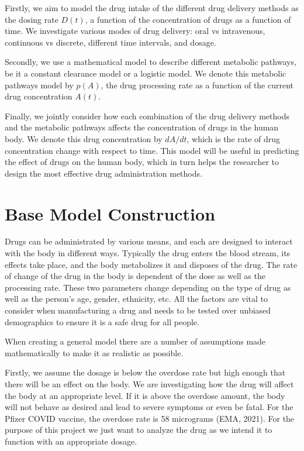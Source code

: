 \documentclass{article}
\begin{document}
Firstly, we aim to model the drug intake of the different drug delivery methods as the dosing rate $D(t)$, a function of the concentration of drugs as a function of time. We investigate various modes of drug delivery: oral vs intravenous, continuous vs discrete, different time intervals, and dosage. 

Secondly, we use a mathematical model to describe different metabolic pathways, be it a constant clearance model or a logistic model. We denote this metabolic pathways model by $p(A)$, the drug processing rate as a function of the current drug concentration $A(t)$.

Finally, we jointly consider how each combination of the drug delivery methods and the metabolic pathways affects the concentration of drugs in the human body. We denote this drug concentration by $dA/dt$, which is the rate of drug concentration change with respect to time. This model will be useful in predicting the effect of drugs on the human body, which in turn helps the researcher to design the most effective drug administration methods.

\section*{Base Model Construction}
Drugs can be administrated by various means, and each are designed to interact with the body in different ways. Typically the drug enters the blood stream, its effects take place, and the body metabolizes it and disposes of the drug. The rate of change of the drug in the body is dependent of the dose as well as the processing rate. These two parameters change depending on the type of drug as well as the person's age, gender, ethnicity, etc. All the factors are vital to consider when manufacturing a drug and needs to be tested over unbiased demographics to ensure it is a safe drug for all people. 

When creating a general model there are a number of assumptions made mathematically to make it as realistic as possible. 

Firstly, we assume the dosage is below the overdose rate but high enough that there will be an effect on the body. We are investigating how the drug will affect the body at an appropriate level. If it is above the overdose amount, the body will not behave as desired and lead to severe symptoms or even be fatal. For the Pfizer COVID vaccine, the overdose rate is 58 micrograms (EMA, 2021). For the purpose of this project we just want to analyze the drug as we intend it to function with an appropriate dosage.
\end{document}
